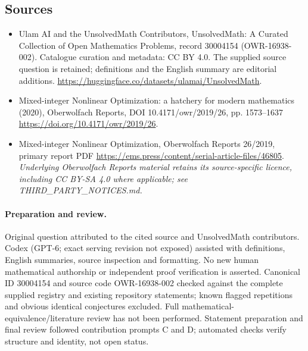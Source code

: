 \documentclass[11pt]{article}
\begin{document}
\subsection{Sources}
\begin{itemize}
\item[\hypertarget{source:30004154:1}{S1}] Ulam AI and the UnsolvedMath Contributors, UnsolvedMath: A Curated Collection of Open Mathematics Problems, record 30004154 (OWR-16938-002). Catalogue curation and metadata: CC BY 4.0. The supplied source question is retained; definitions and the English summary are editorial additions.
\url{https://huggingface.co/datasets/ulamai/UnsolvedMath}.
\item[\hypertarget{source:30004154:2}{S2}] Mixed-integer Nonlinear Optimization: a hatchery for modern mathematics (2020), Oberwolfach Reports, DOI 10.4171/owr/2019/26, pp. 1573--1637
\url{https://doi.org/10.4171/owr/2019/26}.
\item[\hypertarget{source:30004154:3}{S3}] Mixed-integer Nonlinear Optimization, Oberwolfach Reports 26/2019, primary report PDF
\url{https://ems.press/content/serial-article-files/46805}.
\textit{Underlying Oberwolfach Reports material retains its source-specific licence, including CC BY-SA 4.0 where applicable; see THIRD\_PARTY\_NOTICES.md.}
\end{itemize}
\paragraph{Preparation and review.}
Original question attributed to the cited source and UnsolvedMath contributors. Codex (GPT-6; exact serving revision not exposed) assisted with definitions, English summaries, source inspection and formatting. No new human mathematical authorship or independent proof verification is asserted. Canonical ID 30004154 and source code OWR-16938-002 checked against the complete supplied registry and existing repository statements; known flagged repetitions and obvious identical conjectures excluded. Full mathematical-equivalence/literature review has not been performed. Statement preparation and final review followed contribution prompts C and D; automated checks verify structure and identity, not open status.
\label{end:30004154}
\end{document}
